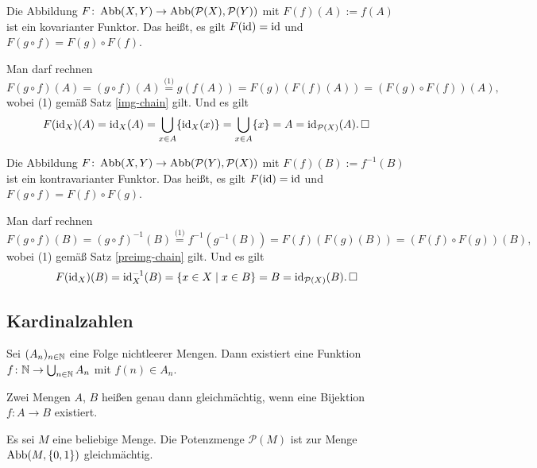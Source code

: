 \begin{Satz}
Die Abbildung $F\colon\operatorname{Abb}(X,Y)\to\operatorname{Abb}(\mathcal P(X),\mathcal P(Y))$
mit $F(f)(A):=f(A)$ ist ein kovarianter Funktor. Das heißt, es gilt
$F(\operatorname{id})=\operatorname{id}$ und $F(g\circ f) = F(g)\circ F(f)$.
\end{Satz}
\begin{Beweis}
Man darf rechnen
\[F(g\circ f)(A) = (g\circ f)(A) \stackrel{\text{(1)}}= g(f(A))
= F(g)(F(f)(A)) = (F(g)\circ F(f))(A),\]
wobei (1) gemäß Satz \ref{img-chain} gilt. Und es gilt
\[F(\operatorname{id}_X)(A) = \operatorname{id}_X(A) = \bigcup_{x\in A} \{\operatorname{id}_X(x)\}
= \bigcup_{x\in A}\{x\}
= A = \operatorname{id}_{\mathcal P(X)}(A).\,\square\]
\end{Beweis}

\begin{Satz}\label{preimg-induces-functor}
Die Abbildung $F\colon\operatorname{Abb}(X,Y)\to\operatorname{Abb}(\mathcal P(Y),\mathcal P(X))$
mit $F(f)(B):=f^{-1}(B)$ ist ein kontravarianter Funktor. Das
heißt, es gilt $F(\operatorname{id}) = \operatorname{id}$ und $F(g\circ f) = F(f)\circ F(g)$.
\end{Satz}
\begin{Beweis}
Man darf rechnen
\[F(g\circ f)(B) = (g\circ f)^{-1}(B)
\stackrel{\text{(1)}}= f^{-1}(g^{-1}(B))
= F(f)(F(g)(B)) = (F(f)\circ F(g))(B),\]
wobei (1) gemäß Satz \ref{preimg-chain} gilt. Und es gilt
\[F(\operatorname{id}_X)(B) = \operatorname{id}_X^{-1}(B) = \{x\in X\mid x\in B\}
= B = \operatorname{id}_{\mathcal P(X)}(B).\,\square\]
\end{Beweis}

\newpage
\subsection{Kardinalzahlen}

\begin{Axiom}\label{acc}%
Sei $(A_n)_{n\in\mathbb N}$ eine Folge nichtleerer Mengen.
Dann existiert eine Funktion $f\colon\mathbb N\to\bigcup_{n\in\mathbb N} A_n$
mit $f(n)\in A_n$.
\end{Axiom}

\begin{Definition}[Gleichmächtigkeit]%
\label{def:equipotent}
Zwei Mengen $A$, $B$ heißen genau dann gleichmächtig, wenn
eine Bijektion $f\colon A\to B$ existiert.
\end{Definition}

\begin{Satz}
Es sei $M$ eine beliebige Menge. Die Potenzmenge $\mathcal P(M)$ ist zur
Menge $\operatorname{Abb}(M,\{0,1\})$ gleichmächtig.
\end{Satz}

